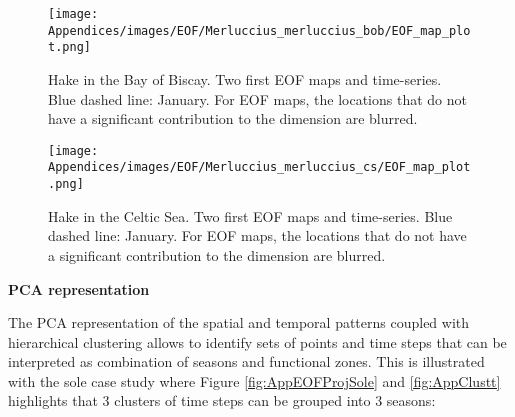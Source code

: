 \begin{figure}[H]
   \begin{center}
      \texttt{[image: Appendices/images/EOF/Merluccius\_merluccius\_bob/EOF\_map\_plot.png]}
   \end{center}
   \caption[Hake in the Bay of Biscay. Two first EOF maps and time-series. Blue dashed line: January.]
   {Hake in the Bay of Biscay. Two first EOF maps and time-series. Blue dashed line: January. For EOF maps, the locations that do not have a significant contribution to the dimension are blurred.}
   \label{fig:AppEOFMapHakeBoB}
\end{figure}

\begin{figure}[H]
   \begin{center}
      \texttt{[image: Appendices/images/EOF/Merluccius\_merluccius\_cs/EOF\_map\_plot.png]}
   \end{center}
   \caption[Hake in the Celtic Sea. Two first EOF maps and time-series. Blue dashed line: January.]
   {Hake in the Celtic Sea. Two first EOF maps  and time-series. Blue dashed line: January. For EOF maps, the locations that do not have a significant contribution to the dimension are blurred.}
   \label{fig:AppEOFMapHakeCS}
\end{figure}

\textbf{PCA representation}

The PCA representation of the spatial and temporal patterns coupled with hierarchical clustering allows to identify sets of points and time steps that can be interpreted as combination of seasons and functional zones. This is illustrated with the sole case study where Figure \ref{fig:AppEOFProjSole} and \ref{fig:AppClustt} highlights that 3 clusters of time steps can be grouped into 3 seasons:


